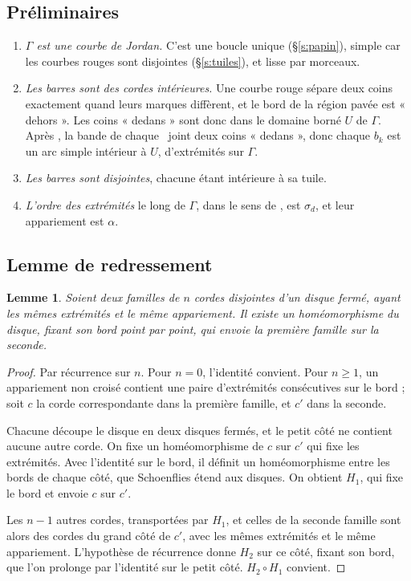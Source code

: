 \documentclass[11pt,a4paper]{article}
\newtheorem{lemme}{Lemme}
\theoremstyle{remark}
\begin{document}
\subsection{Préliminaires}

\begin{enumerate}[label=(\roman*)]
  \item \emph{$\Gamma$ est une courbe de Jordan.} C'est une boucle unique
    (§\ref{s:papin}), simple car les courbes rouges sont disjointes
    (§\ref{s:tuiles}), et lisse par morceaux.
  \item \emph{Les barres sont des cordes intérieures.} Une courbe rouge sépare
    deux coins exactement quand leurs marques diffèrent, et le bord de la région
    pavée est « dehors ». Les coins « dedans » sont donc dans le domaine borné
    $U$ de $\Gamma$. Après \papin, la bande de chaque \CONNECT\ joint deux coins
    « dedans », donc chaque $b_k$ est un arc simple intérieur à $U$, d'extrémités
    sur $\Gamma$.
  \item \emph{Les barres sont disjointes}, chacune étant intérieure à sa tuile.
  \item \emph{L'ordre des extrémités} le long de $\Gamma$, dans le sens de
    \spin, est $\sigma_d$, et leur appariement est $\alpha$.
\end{enumerate}

\subsection{Lemme de redressement}

\begin{lemme}\label{l:redressement}
Soient deux familles de $n$ cordes disjointes d'un disque fermé, ayant les mêmes
extrémités et le même appariement. Il existe un homéomorphisme du disque, fixant
son bord point par point, qui envoie la première famille sur la seconde.
\end{lemme}

\begin{proof}
Par récurrence sur $n$. Pour $n=0$, l'identité convient. Pour $n\ge1$, un
appariement non croisé contient une paire d'extrémités consécutives sur le bord ;
soit $c$ la corde correspondante dans la première famille, et $c'$ dans la
seconde.

Chacune découpe le disque en deux disques fermés, et le petit côté ne contient
aucune autre corde. On fixe un homéomorphisme de $c$ sur $c'$ qui fixe les
extrémités. Avec l'identité sur le bord, il définit un homéomorphisme entre les
bords de chaque côté, que Schoenflies étend aux disques. On obtient $H_1$, qui
fixe le bord et envoie $c$ sur $c'$.

Les $n-1$ autres cordes, transportées par $H_1$, et celles de la seconde famille
sont alors des cordes du grand côté de $c'$, avec les mêmes extrémités et le même
appariement. L'hypothèse de récurrence donne $H_2$ sur ce côté, fixant son bord,
que l'on prolonge par l'identité sur le petit côté. $H_2\circ H_1$ convient.
\end{proof}
\end{document}
